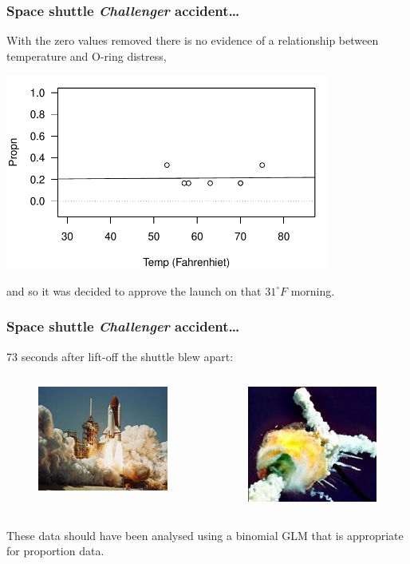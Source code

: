 \documentclass{beamer}\usepackage[]{graphicx}\usepackage[]{xcolor}
\begin{document}
\begin{frame}
\frametitle{Space shuttle {\em Challenger} accident\ldots}
With the zero values removed there is no evidence of a relationship between
temperature and O-ring distress,
\begin{center}
\includegraphics[width=0.8\textwidth]{Figures/NonZeroOringsLM}
\end{center}
and so it was decided to approve the launch on that $31^{\circ} F$ morning.
\end{frame}


\begin{frame}
\frametitle{Space shuttle {\em Challenger} accident\ldots}
73 seconds after lift-off the shuttle blew apart: \\[5mm]
\begin{columns}
\begin{column}{0.5\textwidth}
\begin{figure}
  \centering
  \includegraphics[width=1.8in]{Figures/ShuttleLiftoff.jpg}
\end{figure}
\end{column}
\begin{column}{0.5\textwidth}
\begin{figure}
  \centering
  \includegraphics[width=1.8in]{Figures/ShuttleExplosion.jpg}
\end{figure}
\end{column}
\end{columns}

\bigskip

These data should have been analysed using a binomial GLM 
that is appropriate for proportion data.

\end{frame}
\end{document}
